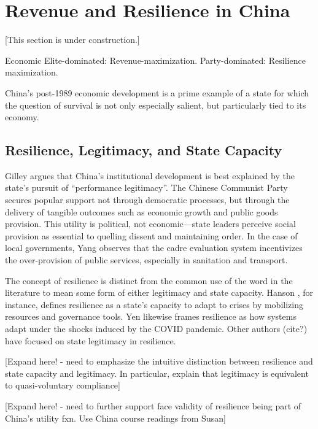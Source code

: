 \documentclass[bibtex,nonblind]{apsr_submission}
\begin{document}
\section{Revenue and Resilience in China}

[This section is under construction.]

Economic Elite-dominated: Revenue-maximization. Party-dominated: Resilience maximization.

China's post-1989 economic development is a prime example of a state for which the question of survival is not only especially salient, but particularly tied to its economy.

\subsection{Resilience, Legitimacy, and State Capacity}

Gilley \cite{gilley2008} argues that China's institutional development is best explained by the state's pursuit of “performance legitimacy”. The Chinese Communist Party secures popular support not through democratic processes, but through the delivery of tangible outcomes such as economic growth and public goods provision. This utility is political, not economic—state leaders perceive social provision as essential to quelling dissent and maintaining order. In the case of local governments, Yang \cite{yang2004} observes that the cadre evaluation system incentivizes the over-provision of public services, especially in sanitation and transport.

The concept of resilience is distinct from the common use of the word in the literature to mean some form of either legitimacy and state capacity. Hanson \cite{hansonStateCapacityResilience2018}, for instance, defines resilience as a state's capacity to adapt to crises by mobilizing resources and governance tools. Yen \cite{yenImperativeStateCapacity2022} likewise frames resilience as how systems adapt under the shocks induced by the COVID pandemic. Other authors (cite?) have focused on state legitimacy in resilience.

[Expand here! - need to emphasize the intuitive distinction between resilience and state capacity and legitimacy. In particular, explain that legitimacy is equivalent to quasi-voluntary compliance]

[Expand here! - need to further support face validity of resilience being part of China's utility fxn. Use China course readings from Susan]
\end{document}
